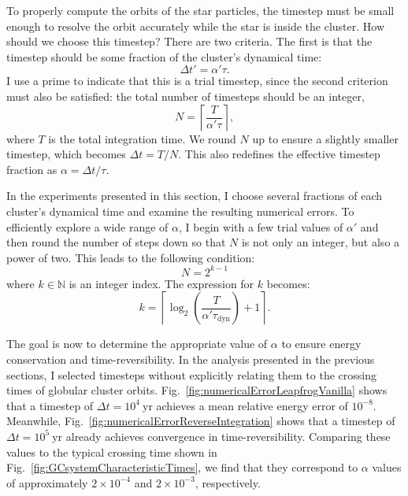         To properly compute the orbits of the star particles, the timestep must be small enough to resolve the orbit accurately while the star is inside the cluster. How should we choose this timestep? There are two criteria. The first is that the timestep should be some fraction of the cluster's dynamical time:
        \begin{equation}
            \Delta t' = \alpha ' \tau.
        \end{equation}
        I use a prime to indicate that this is a trial timestep, since the second criterion must also be satisfied: the total number of timesteps should be an integer, 
        \[
            N = \left\lceil \frac{T}{\alpha' \tau} \right\rceil,
        \]
        where $T$ is the total integration time. We round $N$ up to ensure a slightly smaller timestep, which becomes $\Delta t = T/N$. This also redefines the effective timestep fraction as $\alpha = \Delta t / \tau$.

        In the experiments presented in this section, I choose several fractions of each cluster's dynamical time and examine the resulting numerical errors. To efficiently explore a wide range of $\alpha$, I begin with a few trial values of $\alpha'$ and then round the number of steps down so that $N$ is not only an integer, but also a power of two. This leads to the following condition:
        \begin{equation}
            N = 2^{k-1}
        \end{equation}
        where $k \in \mathbb{N}$ is an integer index. The expression for $k$ becomes:
        \begin{equation} 
            k = \left\lceil \log_2\left(\frac{T}{\alpha '  \tau_\mathrm{dyn}}\right) + 1  \right\rceil.
            \label{eq:binary_time_step_criterion}
        \end{equation}
        
        The goal is now to determine the appropriate value of $\alpha$ to ensure energy conservation and time-reversibility. In the analysis presented in the previous sections, I selected timesteps without explicitly relating them to the crossing times of globular cluster orbits. Fig.~\ref{fig:numericalErrorLeapfrogVanilla} shows that a timestep of $\Delta t = 10^4~\mathrm{yr}$ achieves a mean relative energy error of $10^{-8}$. Meanwhile, Fig.~\ref{fig:numericalErrorReverseIntegration} shows that a timestep of $\Delta t = 10^5~\mathrm{yr}$ already achieves convergence in time-reversibility. Comparing these values to the typical crossing time shown in Fig.~\ref{fig:GCsystemCharacteristicTimes}, we find that they correspond to $\alpha$ values of approximately $2 \times 10^{-4}$ and $2 \times 10^{-3}$, respectively.

